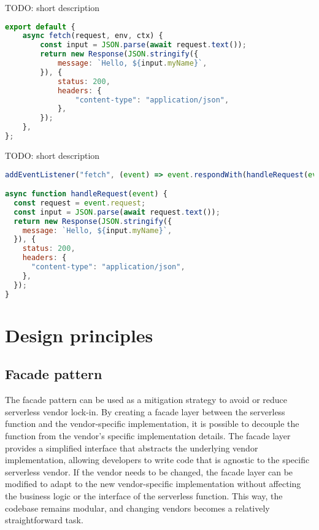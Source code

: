 TODO: short description

\begin{lstlisting}[frame=lines, caption=Basic Cloudflare Workers, captionpos=b, language=JavaScript, showstringspaces=false]
export default {
    async fetch(request, env, ctx) {
        const input = JSON.parse(await request.text());
        return new Response(JSON.stringify({
            message: `Hello, ${input.myName}`,
        }), {
            status: 200,
            headers: {
                "content-type": "application/json",
            },
        });
    },
};
\end{lstlisting}

TODO: short description

\begin{lstlisting}[frame=lines, caption=Basic Fastly Compute@Edge, captionpos=b, language=JavaScript, showstringspaces=false]
addEventListener("fetch", (event) => event.respondWith(handleRequest(event)));

async function handleRequest(event) {
  const request = event.request;
  const input = JSON.parse(await request.text());
  return new Response(JSON.stringify({
    message: `Hello, ${input.myName}`,
  }), { 
    status: 200,
    headers: {
      "content-type": "application/json",
    },
  });
}
\end{lstlisting}

\section{Design principles}
\subsection{Facade pattern}
The \gls{facade} pattern can be used as a mitigation strategy to avoid or reduce \gls{serverless} vendor lock-in. By creating a facade layer between the serverless function and the vendor-specific implementation, it is possible to decouple the function from the vendor's specific implementation details.
The facade layer provides a simplified interface that abstracts the underlying vendor implementation, allowing developers to write code that is agnostic to the specific \gls{serverless} vendor. If the vendor needs to be changed, the facade layer can be modified to adapt to the new vendor-specific implementation without affecting the business logic or the interface of the serverless function. This way, the codebase remains modular, and changing vendors becomes a relatively straightforward task.

